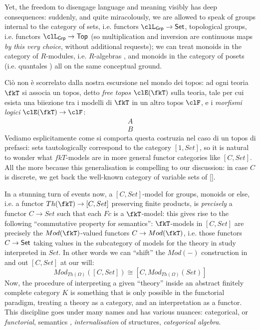 Yet, the freedom to disengage language and meaning visibly has deep consequences: suddenly, and quite miracolously, we are allowed to speak of groups internal to the category of sets, i.e. functors $\clL_{\cate{Grp}} \to \Set$, topological groups, i.e. functors $\clL_{\cate{Grp}} \to \cate{Top}$ (so multiplication and inversion are continuous maps \emph{by this very choice}, without additional requests); we can treat monoids in the category of $R$-modules, i.e. $R$-algebras \cite[]{}, and monoids in the category of posets \cite{} (i.e. quantales \cite{}) all on the same conceptual ground.

Ciò non è scorrelato dalla nostra escursione nel mondo dei topos: ad ogni teoria $\fkT$ si associa un topos, detto \emph{free topos} $\clE(\fkT)$ sulla teoria, tale per cui esista una biiezione tra i modelli di $\fkT$ in un altro topos $\clF$, e i \emph{morfismi logici} $\clE(\fkT) \to \clF$:
\[\begin{array}{c}
		A \\ \hline  B
	\end{array}\]
Vediamo esplicitamente come si comporta questa costruzia nel caso di un topos di prefasci: sets tautologically correspond to the category $[1,Set]$, so it is natural to wonder what $fkT$-models are in more general functor categories like $[C,Set]$. All the more because this generalisation is compelling to our discussion: in case $C$ is discrete, we get back the well-known category of variable sets of \autoref{}.

In a stunning turn of events now, a $[C,Set]$-model for groups, monoids or else, i.e. a functor $Th(\fkT)\to [C,Set]$ preserving finite products, is \emph{precisely} a functor $C\to Set$ such that each $Fc$ is a $\fkT$-model: this gives rise to the following ``commutative property for semantics'': $\fkT$-models in $[C,Set]$ are precisely the $Mod(\fkT)$-valued functors $C\to Mod(\fkT)$, i.e. those functors $C \to \mathsf{Set}$ taking values in the subcategory of models for the theory in study interpreted in $Set$. In other words we can ``shift'' the $Mod(-)$ construction in and out $[C,Set]$ at our will:
\[
	Mod_{Th(\Omega)}([C,Set]) \cong [C, Mod_{Th(\Omega)}(Set)]
\]
Now, the procedure of interpreting a given ``theory'' inside an abstract finitely complete category $K$ is something that is only possible in the functorial paradigm, treating a theory as a category, and an interpretation as a functor. This discipline goes under many names and has various nuances: categorical, or \emph{functorial}, semantics \cite{lawvere1963functorial}, \emph{internalisation} of structures, \emph{categorical algebra}.

